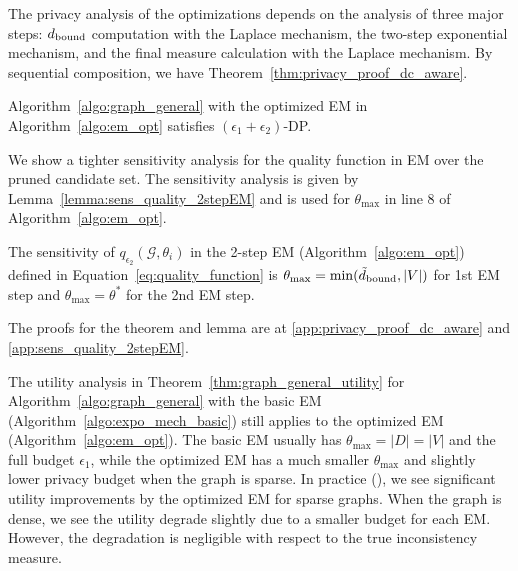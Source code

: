 The privacy analysis of the optimizations depends on the analysis of three major steps: $d_{\normalfont{\text{bound}}}$ computation with the Laplace mechanism, the two-step exponential mechanism, and the final measure calculation with the Laplace mechanism. By sequential composition, we have Theorem~\ref{thm:privacy_proof_dc_aware}. 


\begin{theorem}\label{thm:privacy_proof_dc_aware}
    Algorithm~\ref{algo:graph_general} with the optimized EM in  Algorithm~\ref{algo:em_opt} satisfies $(\epsilon_1 + \epsilon_2)$-DP.
\end{theorem}

We show a tighter sensitivity analysis for the quality function in EM over the pruned candidate set. The sensitivity analysis is given by Lemma~\ref{lemma:sens_quality_2stepEM} and is used for $\theta_{\text{max}}$ in line 8 of Algorithm~\ref{algo:em_opt}.



\begin{lemma} \label{lemma:sens_quality_2stepEM}
The sensitivity of $q_{\epsilon_2}(\mathcal{G}, \theta_i)$ in the 2-step EM (Algorithm~\ref{algo:em_opt})
defined in Equation~\eqref{eq:quality_function} is $\theta_{\max}= \min(\tilde{d}_{\normalfont{\text{bound}}},|V|)$ for 1st EM step and $\theta_{\max}=\theta^*$ for the 2nd EM step.
\end{lemma}


\ifpaper
\else
The proofs for the theorem and lemma are at \cref{app:privacy_proof_dc_aware} and \cref{app:sens_quality_2stepEM}.
\fi 

The utility analysis in Theorem~\ref{thm:graph_general_utility} for Algorithm~\ref{algo:graph_general} with the basic EM (Algorithm~\ref{algo:expo_mech_basic}) still applies to the optimized EM (Algorithm~\ref{algo:em_opt}). The basic EM usually has $\theta_{\max}=|D|=|V|$ and the full budget $\epsilon_1$, while the optimized EM has a much smaller $\theta_{\max}$ and slightly lower privacy budget when the graph is sparse. 
In practice (), we see significant utility improvements by the optimized EM for sparse graphs. When the graph is dense, we see the utility degrade slightly due to a smaller budget for each EM. However, the degradation is negligible with respect to the true inconsistency measure.  


